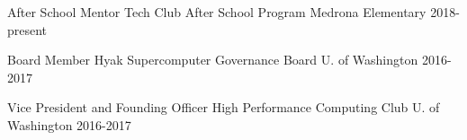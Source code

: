 


\begin{cventries}


\cventry
{After School Mentor} %
{Tech Club After School Program} %
{Medrona Elementary} %
{2018-present} %
{}


\cventry
{Board Member} %
{Hyak Supercomputer Governance Board} %
{U. of Washington} %
{2016-2017} %
{}
    

\cventry
{Vice President and Founding Officer} %
{High Performance Computing Club} %
{U. of Washington} %
{2016-2017} %
{}



\end{cventries}
